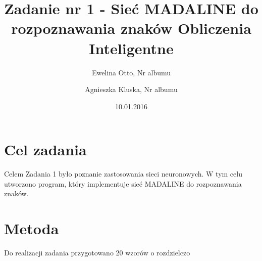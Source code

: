 \documentclass[12pt]{article}
\title{{\bf Zadanie nr 1 - Sieć MADALINE do rozpoznawania znaków}\linebreak
Obliczenia Inteligentne}
\author{Ewelina Otto, Nr albumu \and Agnieszka Kluska, Nr albumu}
\date{10.01.2016}
\begin{document}
\clearpage\maketitle
\thispagestyle{empty}
\newpage
\setcounter{page}{1}
\section{Cel zadania}
Celem Zadania 1 było poznanie zastosowania sieci neuronowych. W tym celu utworzono program, który implementuje sieć MADALINE do rozpoznawania znaków. 

\section{Metoda}
Do realizacji zadania przygotowano 20 wzorów o rozdzielczo
\end{document}
